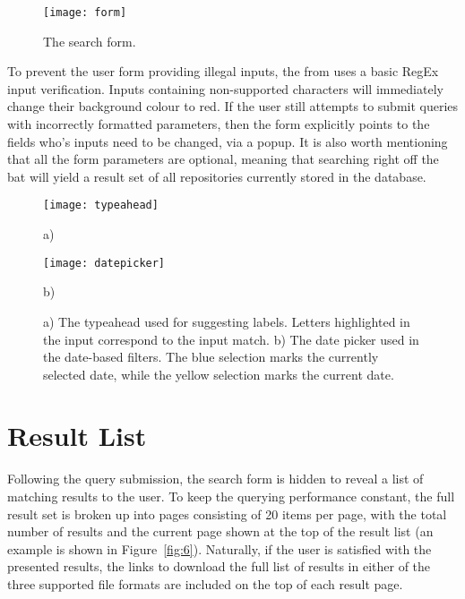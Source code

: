 \begin{figure}[ht!]
    \centering
    \texttt{[image: form]}
    \caption[Search form]{The search form.}
    \label{fig:3}
\end{figure}

To prevent the user form providing illegal inputs, the from uses a basic RegEx input verification.
Inputs containing non-supported characters will immediately change their background colour to red.
If the user still attempts to submit queries with incorrectly formatted parameters, then the form explicitly points to the fields who's inputs need to be changed, via a popup.
It is also worth mentioning that all the form parameters are optional, meaning that searching right off the bat will yield a result set of all repositories currently stored in the database.

\begin{figure}[ht!]
    \centering
    \begin{minipage}[b][][b]{0.60\textwidth}
        \centering
        \texttt{[image: typeahead]}
        \caption*{a)}
    \end{minipage}\hfill
    \begin{minipage}[b][][b]{0.40\textwidth}
        \centering
        \texttt{[image: datepicker]}
        \caption*{b)}
    \end{minipage}
    \label{fig:4}
    \caption[Form input typeahead and date picker]{a) The typeahead used for suggesting labels. Letters highlighted in the input correspond to the input match. b) The date picker used in the date-based filters. The blue selection marks the currently selected date, while the yellow selection marks the current date.}
\end{figure}

\newpage
\section{Result List}

Following the query submission, the search form is hidden to reveal a list of matching results to the user.
To keep the querying performance constant, the full result set is broken up into pages consisting of 20 items per page, with the total number of results and the current page shown at the top of the result list (an example is shown in Figure~\ref{fig:6}).
Naturally, if the user is satisfied with the presented results, the links to download the full list of results in either of the three supported file formats are included on the top of each result page.

